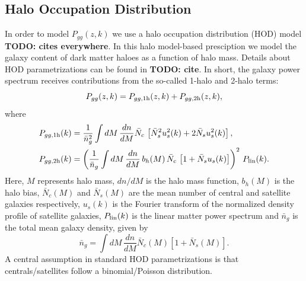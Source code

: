 \documentclass[a4paper,11pt]{article}
\newcommand{\todo}[1]{{\bf TODO: #1}}
\begin{document}
  \subsection{Halo Occupation Distribution}\label{ssec:theory.hod}
    In order to model $P_{gg}(z,k)$ we use a halo occupation distribution (HOD) model \todo{cites everywhere}. In this halo model-based presciption we model the galaxy content of dark matter haloes as a function of halo mass. Details about HOD parametrizations can be found in \todo{cite}. In short, the galaxy power spectrum receives contributions from the so-called 1-halo and 2-halo terms:
    \begin{equation}
      P_{gg}(z,k) = P_{gg,{\rm 1h}}(z,k) + P_{gg,{\rm 2h}}(z,k),
    \end{equation}
    where
    \begin{align}
      & P_{gg,{\rm 1h}}(k)=\frac{1}{\bar{n}_g^2} \int dM\,\frac{dn}{dM} \bar{N}_c\,\left[\bar{N}_s^2u_s^2(k)+2\bar{N}_su_s^2(k)\right],\\
      & P_{gg,{\rm 2h}}(k)=\left(\frac{1}{\bar{n}_g} \int dM\,\frac{dn}{dM}\,b_h(M)\,\bar{N}_c\,\left[1+\bar{N}_su_s(k)\right]\right)^2\,P_{\rm lin}(k).
    \end{align}
    Here, $M$ represents halo mass, $dn/dM$ is the halo mass function, $b_h(M)$ is the halo bias, $\bar{N}_c(M)$ and $\bar{N}_s(M)$ are the mean number of central and satellite galaxies respectively, $u_s(k)$ is the Fourier transform of the normalized density profile of satellite galaxies, $P_{\rm lin}(k)$ is the linear matter power spectrum and $\bar{n}_g$ is the total mean galaxy density, given by
    \begin{equation}
      \bar{n}_g=\int dM\,\frac{dn}{dM}\bar{N}_c(M)\left[1+\bar{N}_s(M)\right].
    \end{equation}
    A central assumption in standard HOD parametrizations is that centrals/satellites follow a binomial/Poisson distribution.
\end{document}
